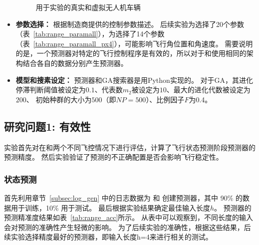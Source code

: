 \begin{itemize}
\begin{figure}[htb]
\caption{用于实验的真实和虚拟无人机车辆}
\label{fig:range_pix}
\end{figure}

\item \textbf{参数选择：}
根据制造商提供的控制参数描述。
后续实验为选择了20个参数（表~\ref{tab:range_paramall}），为选择了14个参数（表~\ref{tab:range_paramall_px4}），可能影响飞行角位置和角速度。
需要说明的是，一个预测器对特定的飞行控制程序是有效的，所以对于和使用相同的架构结合各自的数据分别产生预测器。



\item \textbf{模型和搜素设定：}
预测器和GA搜索器是用Python实现的。
对于GA，其进化停滞判断阈值被设定为$0.1$、代表数$m_{2}$被设定为$10$、最大的进化代数被设定为$200$、
初始种群的大小为$500$（即$NP=500$）、比例因子$F$为0.4。

\end{itemize}


\subsection{研究问题1: 有效性}
实验首先对\icsearcher 在和两个不同飞控情况下进行评估，计算了飞行状态预测阶段预测器的预测精度。
然后实验验证了预测的不正确配置是否会影响飞行稳定性。

\subsubsection{状态预测}
首先利用章节~\ref{subsec:log_gen} 中的日志数据为  和  创建预测器，其中 90\% 的数据用于训练，10\% 用于测试。
最后根据实验结果确定最佳输入长度$h$。
预测器的预测精准度结果如表~\ref{tab:range_acc}所示。
从表中可以观察到，不同长度的输入会对预测的准确性产生轻微的影响。
为了后续实验的准确性，根据这些结果，后续实验选择精度最好的预测器，即输入长度h=4来进行相关的测试。

